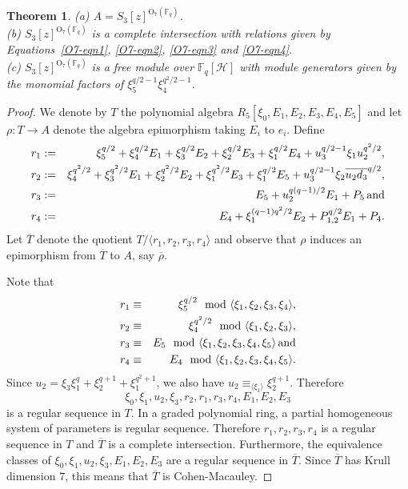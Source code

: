 \documentclass{amsart}
\newtheorem{theorem}[subsection]{Theorem}
\newcommand{\field}{\mathbb{F}}
\newcommand{\orth}[2]{{{\text{O}_{{#1}}(\field_{#2})}}}
\renewcommand{\H}{\mathcal{H}}
\begin{document}
\begin{theorem}\label{O7-main-thm} (a) $A=S_3[z]^{\orth{7}{q}}$.\\
(b) $S_3[z]^{\orth{7}{q}}$ is a complete intersection with relations given by Equations~\ref{O7-eqn1}, \ref{O7-eqn2}, \ref{O7-eqn3} and \ref{O7-eqn4}.\\
(c) $S_3[z]^{\orth{7}{q}}$ is a free module over $\field_q[\H]$ with module generators given by the monomial factors of $\xi_5^{q/2-1}\xi_4^{q^2/2-1}$.
\end{theorem}
\begin{proof} We denote by $T$ the polynomial algebra $R_5[\xi_0,E_1,E_2,E_3,E_4,E_5]$ and let $\rho:T\to A$ denote the algebra epimorphism taking $E_i$ to $e_i$.
Define 
\begin{eqnarray*}
r_1&:=&\xi_5^{q/2}+\xi_4^{q/2}E_1+\xi_3^{q/2}E_2+\xi_2^{q/2}E_3+\xi_1^{q/2}E_4+u_3^{q/2-1}\xi_1u_2^{q^2/2},\\
r_2&:=&\xi_4^{q^2/2}+\xi_3^{q^2/2}E_1+\xi_2^{q^2/2}E_2+\xi_1^{q^2/2}E_3+\xi_1^{q/2}E_5+u_3^{q/2-1}\xi_2\overline{u_2d_3}^{q/2},\\
r_3&:=&E_5+u_2^{q(q-1)/2}E_1+P_5 \, {\rm and} \\
r_4&:=&E_4+\xi_1^{(q-1)q^2/2}E_2+P_{1,2}^{q/2}E_1+P_4.
\end{eqnarray*}
Let $\overline{T}$ denote the quotient $T/\langle r_1,r_2,r_3,r_4\rangle$ and 
observe that $\rho$ induces an epimorphism from $\overline{T}$ to $A$, say $\overline{\rho}$.

Note that 
\begin{eqnarray*}
r_1&\equiv& \xi_5^{q/2} \mod{\langle \xi_1,\xi_2,\xi_3,\xi_4\rangle},\\ 
r_2&\equiv& \xi_4^{q^2/2} \mod{\langle \xi_1,\xi_2,\xi_3\rangle},\\
r_3&\equiv& E_5 \mod{\langle \xi_1,\xi_2,\xi_3,\xi_4,\xi_5\rangle} \, {\rm and} \\
r_4&\equiv &E_4 \mod{\langle \xi_1,\xi_2,\xi_3,\xi_4,\xi_5\rangle}.
\end{eqnarray*}
Since $u_2=\xi_3\xi_1^q+\xi_2^{q+1}+\xi_1^{q^2+1}$, we also have $u_2\equiv_{\langle\xi_1\rangle}\xi_2^{q+1}$.
Therefore $$\xi_0,\xi_1,u_2,\xi_3, r_2, r_1,r_3,r_4,E_1,E_2,E_3$$ is a regular sequence in $T$.
In a graded polynomial ring, a partial homogeneous system of parameters is regular sequence. 
Therefore $r_1,r_2,r_3,r_4$ is a regular sequence  in $T$ and $\overline{T}$ is a complete intersection.
Furthermore, the equivalence classes of $\xi_0,\xi_1,u_2,\xi_3,E_1,E_2,E_3$ are a regular sequence in $\overline{T}$.
Since $\overline{T}$ has Krull dimension $7$, this means that $\overline{T}$ is Cohen-Macauley. 


\end{proof}
\end{document}
